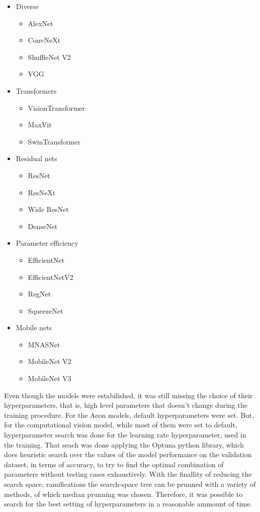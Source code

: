 \begin{itemize}
	\item Diverse
		\begin{itemize}
		    	\item AlexNet
		    	\item ConvNeXt
		    	\item ShuffleNet V2  
			\item VGG	
		\end{itemize}

	\item  Transformers
		\begin{itemize}
			\item VisionTransformer
			\item MaxVit
			\item SwinTransformer
		\end{itemize}
	
	\item  Residual nets
		\begin{itemize}
			\item ResNet
			\item ResNeXt
			\item Wide ResNet
			\item DenseNet
		\end{itemize}
		
	\item Parameter efficiency
		\begin{itemize}
		    	\item EfficientNet
		    	\item EfficientNetV2
		    	\item RegNet
    			\item SqueezeNet  
		\end{itemize}
	
	\item Mobile nets
		\begin{itemize}
			\item MNASNet
			\item MobileNet V2
			\item MobileNet V3
		\end{itemize}
	
\end{itemize}

Even though the models were estabilished, it was still missing the choice of their hyperparameters, that is, high level parameters that doesn't change during the training procedure. For the Aeon models, default hyperparameters were set. But, for the computational vision model, while most of them were set to default, hyperparameter search was done for the learning rate hyperparameter, used in the training. That seach was done applying the Optuna python library, which does heuristic search over the values of the model performance on the validation dataset, in terms of accuracy, to try to find the optimal combination of parameters without testing cases exhaustively. With the finallity of reducing the search space, ramifications the search-space tree can be prunned with a variety of methods, of which median prunning was chosen. Therefore, it was possible to search for the best setting of hyperparameters in a reasonable ammount of time.

